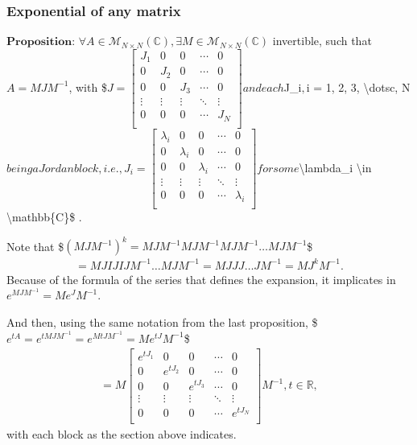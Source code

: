 \documentclass[letterpaper,10pt,english]{jupyterBook}
\begin{document}
\subsubsection{Exponential of any matrix}
\label{\detokenize{cap3:exponential-of-any-matrix}}
\sphinxAtStartPar
\(\textbf{Proposition: } \forall A \in \mathscr{M}_{N \times N}(\mathbb{C}), \exists M \in \mathscr{M}_{N \times N}(\mathbb{C})\) invertible, such that \(A = MJM^{-1}\), with
\$\( 
J = \left[ {\begin{array}{ccccc}
    J_1 & 0 & 0 & \dotsm & 0\\
    0 & J_2 & 0 & \dotsm & 0\\
    0 & 0 & J_3 & \dotsm & 0\\
    \vdots & \vdots & \vdots & \ddots & \vdots\\
    0 & 0 & 0 & \dotsm & J_{N}\\
\end{array} } \right]
\)\(
and each \)J\_i\(, \)i = 1, 2, 3, \textbackslash{}dotsc, N\( being a Jordan block, i.e., 
\)\(
J_i = \left[ {\begin{array}{ccccc}
    \lambda_i & 0 & 0 & \dotsm & 0\\
    0 & \lambda_i & 0 & \dotsm & 0\\
    0 & 0 & \lambda_i & \dotsm & 0\\
    \vdots & \vdots & \vdots & \ddots & \vdots\\
    0 & 0 & 0 & \dotsm & \lambda_i\\
\end{array} } \right]
\)\( 
for some \)\textbackslash{}lambda\_i \textbackslash{}in \textbackslash{}mathbb\{C\}\$ .

\sphinxAtStartPar
Note that
\$\(
    (MJM^{-1})^k = MJM^{-1}MJM^{-1}MJM^{-1} \dotsc MJM^{-1} 
\)\$
\begin{equation*}
\begin{split}
    = MJIJIJM^{-1} \dotsc MJM^{-1} = MJJJ \dotsc JM^{-1} = MJ^kM^{-1}.
\end{split}
\end{equation*}
\sphinxAtStartPar
Because of the formula of the series that defines the expansion, it implicates in \(e^{MJM^{-1}} = M e^J M^{-1}\).

\sphinxAtStartPar
And then, using the same notation from the last proposition,
\$\(
e^{tA} = e^{tMJM^{-1}} = e^{MtJM^{-1}} = Me^{tJ}M^{-1} 
\)\$
\begin{equation*}
\begin{split}
    = M \left[ { \begin{array}{ccccc}
        e^{tJ_1} & 0 & 0 & \dotsm & 0\\
        0 & e^{tJ_2} & 0 & \dotsm & 0\\
        0 & 0 & e^{tJ_3} & \dotsm & 0\\
        \vdots & \vdots & \vdots & \ddots & \vdots\\
        0 & 0 & 0 & \dotsm & e^{tJ_{N}}\\
    \end{array} } \right] M^{-1}, t \in \mathbb{R},
\end{split}
\end{equation*}
\sphinxAtStartPar
with each block as the section above indicates.
\end{document}

